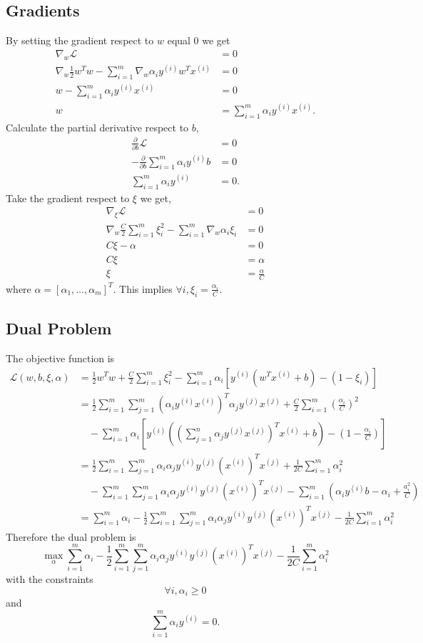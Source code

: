 \documentclass{article}
\begin{document}
\subsection{Gradients}
By setting the gradient respect to $w$ equal 0 we get
\begin{align*}
\nabla_w\mathcal{L}&=0 \\
\nabla_w\frac{1}{2}w^Tw-\sum_{i=1}^m \nabla_w\alpha_iy^{(i)}w^Tx^{(i)}&=0 \\
w-\sum_{i=1}^m\alpha_iy^{(i)}x^{(i)}&=0 \\
w&=\sum_{i=1}^m\alpha_iy^{(i)}x^{(i)}.
\end{align*}
Calculate the partial derivative respect to $b$,
\begin{align*}
\frac{\partial}{\partial b}\mathcal{L}&=0 \\
-\frac{\partial}{\partial b}\sum_{i=1}^m\alpha_iy^{(i)}b&=0 \\
\sum_{i=1}^m\alpha_iy^{(i)}&=0.
\end{align*}
Take the gradient respect to $\xi$ we get,
\begin{align*}
\nabla_\xi\mathcal{L}&=0 \\
\nabla_w\frac{C}{2}\sum_{i=1}^m\xi_i^2-\sum_{i=1}^m \nabla_w\alpha_i\xi_i&=0 \\
C\xi-\alpha&=0 \\
C\xi&=\alpha \\
\xi&=\frac{\alpha}{C}
\end{align*}
where $\alpha=[\alpha_1,\ldots,\alpha_m]^T$. This implies $\forall i, \xi_i=\frac{\alpha_i}{C}$.

\subsection{Dual Problem}
The objective function is
\begin{align*}
\mathcal{L}(w,b,\xi,\alpha) &=\frac{1}{2}w^Tw+\frac{C}{2}\sum_{i=1}^m\xi_i^2 -\sum_{i=1}^m\alpha_i[y^{(i)}(w^Tx^{(i)}+b)-(1-\xi_i)] \\
&=\frac{1}{2}\sum_{i=1}^m\sum_{j=1}^m(\alpha_iy^{(i)}x^{(i)})^T \alpha_jy^{(j)}x^{(j)}+ \frac{C}{2}\sum_{i=1}^m(\frac{\alpha_i}{C})^2 \\ &\quad-\sum_{i=1}^m\alpha_i[y^{(i)}((\sum_{j=1}^n\alpha_jy^{(j)}x^{(j)})^Tx^{(i)}+b)-(1-\frac{\alpha_i}{C})] \\
&=\frac{1}{2}\sum_{i=1}^m\sum_{j=1}^m\alpha_i\alpha_jy^{(i)} y^{(j)}(x^{(i)})^Tx^{(j)}+\frac{1}{2C}\sum_{i=1}^m\alpha_i^2 \\
&\quad-\sum_{i=1}^m\sum_{j=1}^m\alpha_i\alpha_jy^{(i)} y^{(j)}(x^{(i)})^T x^{(j)}-\sum_{i=1}^m(\alpha_iy^{(i)}b-\alpha_i+\frac{a_i^2}{C}) \\
&=\sum_{i=1}^m\alpha_i-\frac{1}{2}\sum_{i=1}^m\sum_{j=1}^m\alpha_i \alpha_jy^{(i)}y^{(j)}(x^{(i)})^Tx^{(j)}- \frac{1}{2C}\sum_{i=1}^m\alpha_i^2
\end{align*}
Therefore the dual problem is $$\max_\alpha \sum_{i=1}^m\alpha_i-\frac{1}{2}\sum_{i=1}^m\sum_{j=1}^m\alpha_i \alpha_jy^{(i)}y^{(j)}(x^{(i)})^Tx^{(j)}- \frac{1}{2C}\sum_{i=1}^m\alpha_i^2$$ with the constraints $$\forall i,\alpha_i\ge0$$ and $$\sum_{i=1}^m\alpha_iy^{(i)}=0.$$
\end{document}
